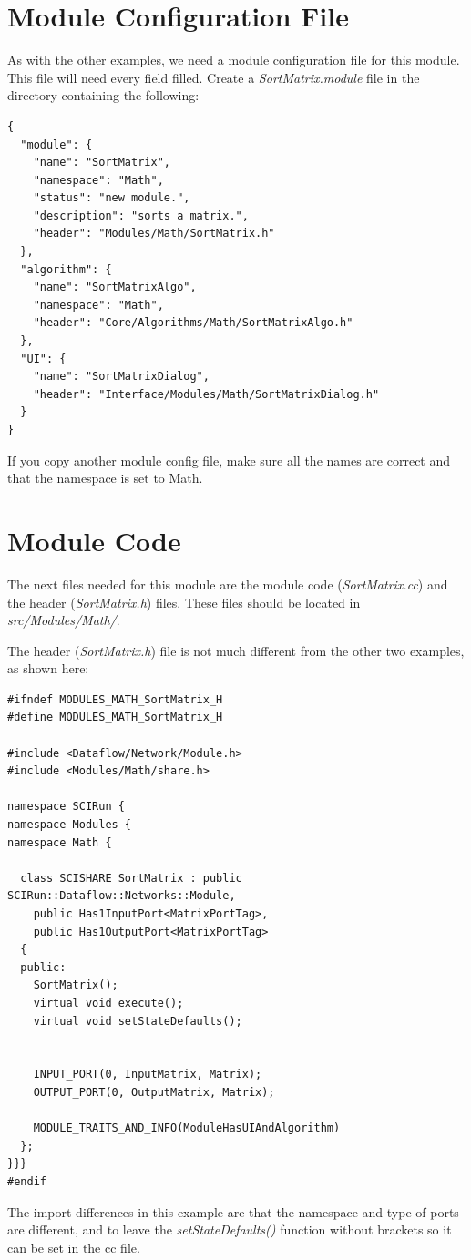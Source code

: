 \documentclass[fleqn,11pt,openany]{book}
\begin{document}
\section{Module Configuration File}
\label{sec:algoconfig}

As with the other examples, we need a module configuration file for this module.  
This file will need every field filled.  
Create a \emph{SortMatrix.module} file in the \emph{} directory containing the following:
\begin{verbatim}
{
  "module": {
    "name": "SortMatrix",
    "namespace": "Math",
    "status": "new module.",
    "description": "sorts a matrix.",
    "header": "Modules/Math/SortMatrix.h"
  },
  "algorithm": {
    "name": "SortMatrixAlgo",
    "namespace": "Math",
    "header": "Core/Algorithms/Math/SortMatrixAlgo.h"
  },
  "UI": {
    "name": "SortMatrixDialog",
    "header": "Interface/Modules/Math/SortMatrixDialog.h"
  }
}
\end{verbatim}
If you copy another module config file, make sure all the names are correct and that the namespace is set to Math.  

\section{Module Code}
\label{sec:algo_module}

The next files needed for this module are the module code (\emph{SortMatrix.cc}) and the header (\emph{SortMatrix.h}) files. 
These files should be located in \emph{src/Modules/Math/}.

The header (\emph{SortMatrix.h}) file is not much different from the other two examples, as shown here:
\begin{verbatim}
#ifndef MODULES_MATH_SortMatrix_H
#define MODULES_MATH_SortMatrix_H

#include <Dataflow/Network/Module.h>
#include <Modules/Math/share.h>

namespace SCIRun {
namespace Modules {
namespace Math {
  
  class SCISHARE SortMatrix : public SCIRun::Dataflow::Networks::Module,
    public Has1InputPort<MatrixPortTag>,
    public Has1OutputPort<MatrixPortTag>
  {
  public:
    SortMatrix();
    virtual void execute();
    virtual void setStateDefaults();
   
    
    INPUT_PORT(0, InputMatrix, Matrix);
    OUTPUT_PORT(0, OutputMatrix, Matrix);
    
    MODULE_TRAITS_AND_INFO(ModuleHasUIAndAlgorithm)
  };
}}}
#endif
\end{verbatim}
The import differences in this example are that the namespace and type of ports are different, and to leave the \emph{setStateDefaults()} function without brackets so it can be set in the cc file.  
\end{document}
